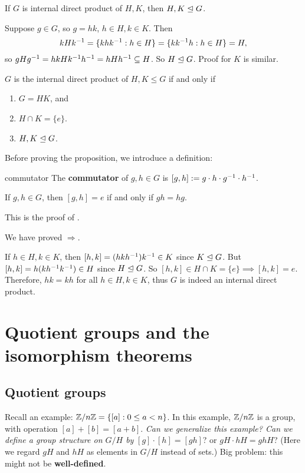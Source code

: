 \begin{lemma}
If $G$ is internal direct product of $H,K$, then $H,K\trianglelefteq G$.
\end{lemma}

\begin{pf}
Suppose $g\in G$, so $g=hk$, $h\in H,k\in K$. Then 
$$kHk^{-1} = \{khk^{-1}: h\in H\}= \{kk^{-1} h: h\in H\}=H,$$
so $gHg^{-1} = hkHk^{-1} h^{-1} = hHh^{-1} \subseteq H$. So $H\trianglelefteq G$. Proof for $K$ is similar.
\end{pf}

\begin{prop}
$G$ is the internal direct product of $H,K\le G$ if and only if 
\begin{enumerate}[label=(\alph*)]
\item $G=HK$, and 
\item $H\cap K=\{e\}$.
\item $H,K\trianglelefteq G$.
\end{enumerate}
\end{prop}

Before proving the proposition, we introduce a definition:

\begin{defn}{commutator}
The \textbf{commutator} of $g,h\in G$ is $[g,h]:=g\cdot h\cdot g^{-1} \cdot h^{-1}$.
\end{defn}

\begin{lemma}
If $g,h\in G$, then $[g,h]=e$ if and only if $gh=hg$.
\end{lemma}

\begin{pf}
This is the proof of .

We have proved $\Rightarrow$.

If $h\in H,k\in K$, then $[h,k]=(hkh^{-1})k^{-1} \in K$ since $K\trianglelefteq G$. But $[h,k]= h(kh^{-1} k^{-1})\in H$ since $H\trianglelefteq G$. So $[h,k]\in H\cap K=\{e\}\implies [h,k]=e$. Therefore, $hk=kh$ for all $h\in H,k\in K$, thus $G$ is indeed an internal direct product.
\end{pf}

\chapter{Quotient groups and the isomorphism theorems} 

\section{Quotient groups}
Recall an example: $\mathbb Z/n\mathbb Z = \{[a]: 0\le a <n\}$. In this example, $\mathbb Z/n\mathbb Z$ is a group, with operation $[a]+[b]=[a+b]$. \textit{Can we generalize this example? Can we define a group structure on $G/H$ by} $[g]\cdot [h]=[gh]$? or $gH\cdot hH=ghH$? (Here we regard $gH$ and $hH$ as elements in $G/H$ instead of sets.) Big problem: this might not be \textbf{well-defined}.

